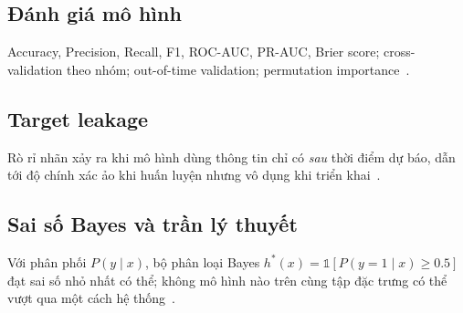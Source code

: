 \subsection{Đánh giá mô hình}
Accuracy, Precision, Recall, F1, ROC-AUC, PR-AUC, Brier score; cross-validation theo nhóm;
out-of-time validation; permutation importance~\cite{breiman2001random}.

\subsection{Target leakage}
Rò rỉ nhãn xảy ra khi mô hình dùng thông tin chỉ có \emph{sau} thời điểm dự báo, dẫn tới
độ chính xác ảo khi huấn luyện nhưng vô dụng khi triển khai~\cite{kaufman2012leakage}.

\subsection{Sai số Bayes và trần lý thuyết}
Với phân phối $P(y\mid x)$, bộ phân loại Bayes $h^*(x)=\mathbb{1}[P(y=1\mid x)\ge 0.5]$ đạt sai số
nhỏ nhất có thể; không mô hình nào trên cùng tập đặc trưng có thể vượt qua một cách hệ thống~\cite{hastie2009elements}.

